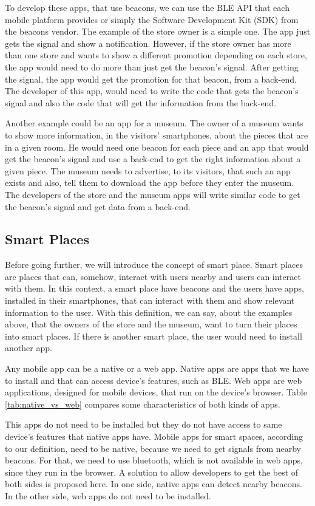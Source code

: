 To develop these apps, that use beacons, we can use the 
BLE API that each 
mobile platform provides or simply the Software
Development Kit (SDK) from the 
beacons vendor. The example of the store owner is a
simple one. The app just gets the signal and show a 
notification. However, if the store owner has more than
one store and wants to show a different promotion depending
on each store, the app would need to do more than just get
the beacon's signal. After getting the signal, the app
would get the promotion for that beacon, from a 
back-end. The developer of this app, would need to
write the code that gets the beacon's signal and also
the code that will get the information from the back-end.

Another example could be an app for a museum. The owner
of a museum wants to show more information, in the 
visitors' smartphones, about the pieces that are in a given
room. He would need one beacon for each piece and an app
that would get the beacon's signal and use a
back-end to get the right information about a given piece.
The museum needs to advertise, to its visitors, that such
an app exists and also, tell them to download the app
before they enter the museum. The developers of the
store and the museum apps will write similar code to get
the beacon's signal and get data from a back-end.

\subsection{Smart Places}
\label{sub:smart_places}
Before going further, we will introduce the concept of
smart place. Smart places are places that can, somehow,
interact with users nearby and users can interact 
with them.
In this context, a smart place have beacons and the users
have apps, installed in their smartphones, that can interact
with them and show relevant information to the user.
With this definition, we can say, about the examples above,
that the owners of the store and the museum, want to
turn their places into smart places.
If there is another smart place, the user would need to
install another app.

Any mobile app can be a native or a web app. Native apps
are apps that we have to install and that can access
device's features, such as BLE. Web apps are web
applications, designed for mobile devices, that run
on the device's browser. Table \ref{tab:native_vs_web}
compares some characteristics of both kinds of apps.

This apps do not need to be
installed but they do not have access
to same device's features that native apps have.
Mobile apps for smart spaces, according to our definition,
need to be native, because we need to get signals from
nearby beacons. For that, we need to use bluetooth, which is
not available in web apps, since they run in the browser.
A solution to allow developers to get the best of both sides
is proposed here. In one side,
native apps can detect nearby beacons. In the other side,
web apps do not need to be installed.

